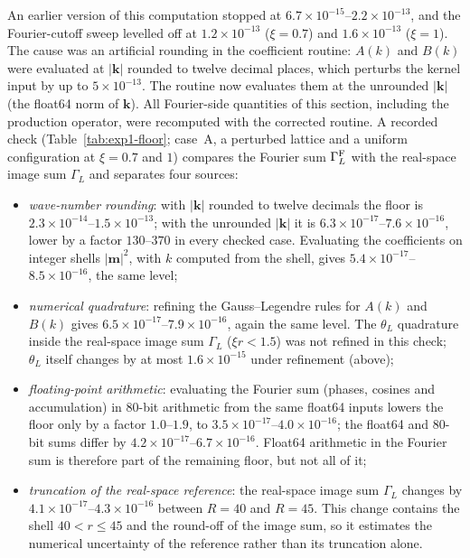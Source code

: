 An earlier version of this computation stopped at $6.7\times10^{-15}$--$2.2\times10^{-13}$, and the Fourier-cutoff
sweep levelled off at $1.2\times10^{-13}$ ($\xi=0.7$) and $1.6\times10^{-13}$ ($\xi=1$). The cause was
an artificial rounding in the coefficient routine: $A(k)$ and
$B(k)$ were evaluated at $|\mathbf k|$ rounded to twelve decimal places, which perturbs the kernel input by up to
$5\times10^{-13}$. The routine now evaluates them at the unrounded $|\mathbf k|$ (the float64 norm of $\mathbf k$). All Fourier-side quantities of this
section, including the production operator, were recomputed with the corrected routine. A recorded check
(Table~\ref{tab:exp1-floor}; case~A, a perturbed lattice and a uniform configuration at $\xi=0.7$ and $1$) compares the
Fourier sum $\Gamma_L^{\rm F}$ with the real-space image sum $\Gamma_L$ and separates four sources:
\begin{itemize}
\item \emph{wave-number rounding}: with $|\mathbf k|$ rounded to twelve decimals the floor is $2.3\times10^{-14}$--$1.5\times10^{-13}$; with
  the unrounded $|\mathbf k|$ it is $6.3\times10^{-17}$--$7.6\times10^{-16}$, lower by a factor $130$--$370$ in every
  checked case. Evaluating the coefficients on integer shells $|\mathbf m|^2$, with $k$ computed from the shell, gives
  $5.4\times10^{-17}$--$8.5\times10^{-16}$, the same level;
\item \emph{numerical quadrature}: refining the Gauss--Legendre rules for $A(k)$ and $B(k)$ gives
  $6.5\times10^{-17}$--$7.9\times10^{-16}$, again the same level. The $\theta_L$ quadrature inside the real-space image
  sum $\Gamma_L$ ($\xi r<1.5$) was not refined in this check; $\theta_L$ itself changes by at most $1.6\times10^{-15}$
  under refinement (above);
\item \emph{floating-point arithmetic}: evaluating the Fourier sum (phases, cosines and accumulation) in 80-bit
  arithmetic from the same float64 inputs lowers the floor only by a factor $1.0$--$1.9$, to
  $3.5\times10^{-17}$--$4.0\times10^{-16}$; the float64 and 80-bit sums differ by $4.2\times10^{-17}$--$6.7\times10^{-16}$.
  Float64 arithmetic in the Fourier sum is therefore part of the remaining floor, but not all of it;
\item \emph{truncation of the real-space reference}: the real-space image sum $\Gamma_L$ changes by
  $4.1\times10^{-17}$--$4.3\times10^{-16}$ between $R=40$ and $R=45$. This change contains the shell $40<r\le45$ and the
  round-off of the image sum, so it estimates the numerical uncertainty of the reference rather than its truncation
  alone.
\end{itemize}
